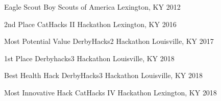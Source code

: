 



\begin{cvhonors}

  \cvhonor
    {Eagle Scout} %
    {Boy Scouts of America} %
    {Lexington, KY} %
    {2012} %

  \cvhonor
    {2nd Place} %
    {CatHacks II Hackathon} %
    {Lexington, KY} %
    {2016} %

  \cvhonor
    {Most Potential Value} %
    {DerbyHacks2 Hackathon} %
    {Louisville, KY} %
    {2017} %

  \cvhonor
    {1st Place} %
    {Derbyhacks3 Hackathon} %
    {Louisville, KY} %
    {2018} %

  \cvhonor
    {Best Health Hack} %
    {DerbyHacks3 Hackathon} %
    {Louisville, KY} %
    {2018} %

  \cvhonor
    {Most Innovative Hack} %
    {CatHacks IV Hackathon} %
    {Lexington, KY} %
    {2018} %

\end{cvhonors}
